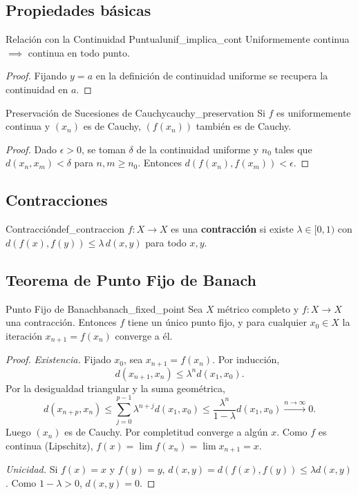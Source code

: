 \documentclass[11pt, a4paper]{article}
\begin{document}
\subsection{Propiedades básicas}

\begin{proposicion}{Relación con la Continuidad Puntual}{unif_implica_cont}
Uniformemente continua $\implies$ continua en todo punto.
\end{proposicion}

\begin{proof}
Fijando $y = a$ en la definición de continuidad uniforme se recupera la continuidad en $a$.
\end{proof}

\begin{proposicion}{Preservación de Sucesiones de Cauchy}{cauchy_preservation}
Si $f$ es uniformemente continua y $(x_n)$ es de Cauchy, $(f(x_n))$ también es de Cauchy.
\end{proposicion}

\begin{proof}
Dado $\epsilon > 0$, se toman $\delta$ de la continuidad uniforme y $n_0$ tales que
$d(x_n, x_m) < \delta$ para $n, m \ge n_0$. Entonces $d(f(x_n), f(x_m)) < \epsilon$.
\end{proof}

\subsection{Contracciones}

\begin{definicion}{Contracción}{def_contraccion}
$f: X \to X$ es una \textbf{contracción} si existe $\lambda \in [0, 1)$ con
$d(f(x), f(y)) \le \lambda\, d(x, y)$ para todo $x, y$.
\end{definicion}

\subsection{Teorema de Punto Fijo de Banach}

\begin{teorema}{Punto Fijo de Banach}{banach_fixed_point}
Sea $X$ métrico completo y $f: X \to X$ una contracción. Entonces $f$ tiene un único punto
fijo, y para cualquier $x_0 \in X$ la iteración $x_{n+1} = f(x_n)$ converge a él.
\end{teorema}

\begin{proof}
\textit{Existencia.} Fijado $x_0$, sea $x_{n+1} = f(x_n)$. Por inducción,
$$ d(x_{n+1}, x_n) \le \lambda^n d(x_1, x_0). $$
Por la desigualdad triangular y la suma geométrica,
$$ d(x_{n+p}, x_n) \le \sum_{j=0}^{p-1} \lambda^{n+j} d(x_1, x_0) \le \frac{\lambda^n}{1-\lambda}
d(x_1, x_0) \xrightarrow{n \to \infty} 0. $$
Luego $(x_n)$ es de Cauchy. Por completitud converge a algún $x$. Como $f$ es continua
(Lipschitz), $f(x) = \lim f(x_n) = \lim x_{n+1} = x$.

\textit{Unicidad.} Si $f(x) = x$ y $f(y) = y$, $d(x, y) = d(f(x), f(y)) \le \lambda d(x, y)$. Como
$1 - \lambda > 0$, $d(x, y) = 0$.
\end{proof}
\end{document}

